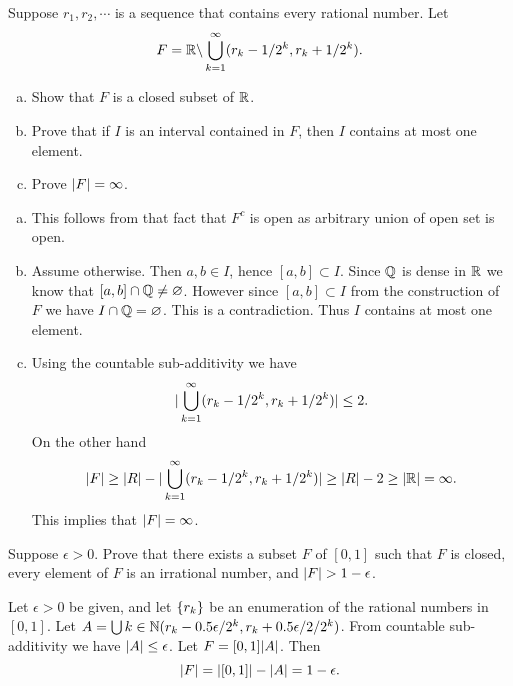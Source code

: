 \begin{problem}
	Suppose $ r_1,r_2,\cdots $ is a sequence that contains every rational number. Let 
	\[ F = \mathbb{R} \backslash \bigcup_{k=1}^{\infty}(r_k - 1/2^k, r_k + 1/2^k). \]
	\begin{enumerate}[(a)]
		\item Show that $ F $ is a closed subset of $ \mathbb{R} $.
		\item Prove that if $ I $ is an interval contained in $ F $, then $ I $ contains at most one element.
		\item Prove $ |F| = \infty $.
	\end{enumerate}
\end{problem}
\begin{solution}
	\begin{enumerate}[(a)]
		\item This follows from that fact that $ F^c $ is open as arbitrary union of open set is open.
		\item Assume otherwise. Then $ a,b \in I $, hence $ [a,b]\subset I $. Since $ \mathbb{Q} $ is dense in $ \mathbb{R} $ we know that $ [a,b]\cap \mathbb{Q} \neq \varnothing $. However since $ [a,b]\subset I $ from the construction of $ F $ we have $ I \cap \mathbb{Q} = \varnothing $. This is a contradiction. Thus $ I $ contains at most one element.
		\item Using the countable sub-additivity we have
		\[ |\bigcup_{k=1}^\infty (r_k - 1/2^k, r_k + 1/2^k)| \leq 2. \]
		On the other hand
		\[ |F| \geq |R| - |\bigcup_{k=1}^\infty (r_k - 1/2^k, r_k + 1/2^k)|  \geq |R| - 2 \geq |\mathbb{R}| = \infty. \]
		This implies that $ |F| = \infty $.
	\end{enumerate}
\end{solution}

\begin{problem}
	Suppose $ \epsilon> 0 $. Prove that there exists a subset $ F $ of $ [0,1] $ such that $ F $ is closed, every element of $ F $ is an irrational number, and $ |F| > 1-\epsilon $.
\end{problem}
\begin{solution}
	Let $ \epsilon>0 $ be given, and let $ \{r_k\} $ be an enumeration of the rational numbers in $ [0,1] $. Let
	$ A = \bigcup{k\in\mathbb{N}}(r_k - 0.5\epsilon/2^k, r_k + 0.5\epsilon/2/2^k) $. From countable sub-additivity we have $ |A| \leq \epsilon $. Let $ F = [0,1] |A| $. Then 
	\[ |F| = |[0,1]| - |A| = 1 - \epsilon. \]
\end{solution}













